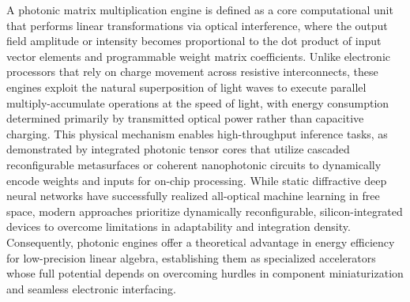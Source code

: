 \documentclass[11pt]{article}
\begin{document}
A photonic matrix multiplication engine is defined as a core computational unit that performs linear transformations via optical interference, where the output field amplitude or intensity becomes proportional to the dot product of input vector elements and programmable weight matrix coefficients. \citep{doi_10_1109_hpca57654_2024_00059_f488ee7a} Unlike electronic processors that rely on charge movement across resistive interconnects, these engines exploit the natural superposition of light waves to execute parallel multiply-accumulate operations at the speed of light, with energy consumption determined primarily by transmitted optical power rather than capacitive charging. \citep{doi_10_1109_icop56156_2022_9911729_8d67554d} \citep{doi_10_1145_3716368_3735243_93c8da73} This physical mechanism enables high-throughput inference tasks, as demonstrated by integrated photonic tensor cores that utilize cascaded reconfigurable metasurfaces or coherent nanophotonic circuits to dynamically encode weights and inputs for on-chip processing. While static diffractive deep neural networks have successfully realized all-optical machine learning in free space, modern approaches prioritize dynamically reconfigurable, silicon-integrated devices to overcome limitations in adaptability and integration density. Consequently, photonic engines offer a theoretical advantage in energy efficiency for low-precision linear algebra, establishing them as specialized accelerators whose full potential depends on overcoming hurdles in component miniaturization and seamless electronic interfacing. \citep{doi_10_1088_1402_4896_ae8345_3b948559} \citep{doi_10_1515_nanoph_2022_0423_38a2c3ec} \citep{doi_10_3390_nano14080697_c372a140}
\end{document}
